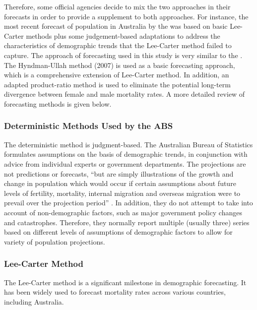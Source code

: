 \documentclass[11pt,a4paper,]{article}
\begin{document}
Therefore, some official agencies decide to mix the two approaches in their forecasts in order to provide a supplement to both approaches. For instance, the most recent forecast of population in Australia by the \textcite{PC13} was based on basic Lee-Carter methods plus some judgement-based adaptations to address the characteristics of demographic trends that the Lee-Carter method failed to capture. The approach of forecasting used in this study is very similar to the \textcite{PC13}. The Hyndman-Ullah method (2007) is used as a basic forecasting approach, which is a comprehensive extension of Lee-Carter method. In addition, an adapted product-ratio method is used to eliminate the potential long-term divergence between female and male mortality rates. A more detailed review of forecasting methods is given below.

\hypertarget{deterministic-methods-used-by-the-abs}{%
\subsubsection{Deterministic Methods Used by the ABS}\label{deterministic-methods-used-by-the-abs}}

The deterministic method is judgment-based. The Australian Bureau of Statistics formulates assumptions on the basis of demographic trends, in conjunction with advice from individual experts or government departments. The projections are not predictions or forecasts, ``but are simply illustrations of the growth and change in population which would occur if certain assumptions about future levels of fertility, mortality, internal migration and overseas migration were to prevail over the projection period'' \autocite[p.2]{ABS12}. In addition, they do not attempt to take into account of non-demographic factors, such as major government policy changes and catastrophes. Therefore, they normally report multiple (usually three) series based on different levels of assumptions of demographic factors to allow for variety of population projections.

\hypertarget{lee-carter-method}{%
\subsubsection{Lee-Carter Method}\label{lee-carter-method}}

The Lee-Carter method \autocite{LC92} is a significant milestone in demographic forecasting. It has been widely used to forecast mortality rates across various countries, including Australia.
\end{document}
